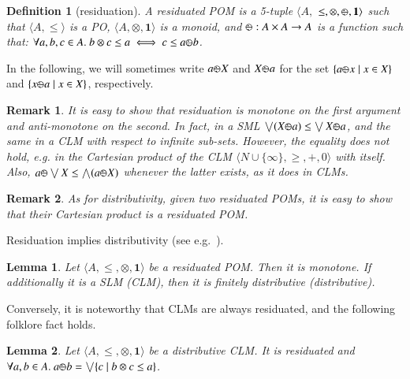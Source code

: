 \documentclass[a4paper]{elsarticle}
\newtheorem{definition}{Definition}
\newtheorem{remark}{Remark}
\newtheorem{lemma}{Lemma}
\newcommand{\monop}{\otimes}
\newcommand{\1}{\mathbf{1}}
\def\odiv{{ \ominus\hspace{-8pt}:}\;}
\begin{document}
\begin{definition}[residuation]
	A residuated POM is a 5-tuple $\langle A,$ $\leq, \otimes,  \odiv, \1 \rangle$ such that
	$\langle A, \leq \rangle$ is a PO,  $\langle A, \otimes, \1 \rangle$ is a monoid, and
	$\odiv: A \times A \rightarrow A$ is a function such that: $\forall a, b, c \in A.\ b \otimes c \leq a \iff c \leq a \odiv b$.
\end{definition}

In the following, we will sometimes write $a \odiv X$ and $X \odiv a$
for the set  $\{a \odiv x \mid x \in X\}$ and  $\{x \odiv a \mid x \in X\}$,
respectively.

\begin{remark}
	It is easy to show that residuation is monotone on the first argument and
	anti-monotone on the second. In fact, in a SML 
	$\bigvee (X \odiv a) \leq \bigvee X \odiv a$,
	and the same in a CLM with respect to infinite sub-sets.
	However, the equality does not hold,
	e.g. in the Cartesian product of the CLM  
	$\langle N \cup \{\infty\}, \geq, +, 0 \rangle$ with itself.
	Also, 
	$a \odiv \bigvee X \leq \bigwedge (a \odiv X)$
	whenever the latter exists, as it does in CLMs.
\end{remark}

\begin{remark}
	\label{remarkC}
	As for distributivity, given two residuated POMs, it is easy to show that their Cartesian product
	is a residuated POM.
\end{remark}

Residuation implies distributivity (see e.g.~\cite[Lemma 2.2]{ipl}).

\begin{lemma}
	Let $\langle A, \leq, \monop, \1 \rangle$ be a residuated POM. 
	Then it is monotone.
	If additionally it is a SLM (CLM), then it is finitely distributive
	(distributive).
\end{lemma}

Conversely, it is noteworthy that CLMs are always residuated,
and the following folklore fact holds.
%

\begin{lemma}
	\label{resCLM}
	Let $\langle A, \leq, \monop, \1 \rangle$ be a distributive CLM. 
	It is residuated and 
	$\forall a, b \in A.\ a \odiv b = \bigvee \{c \mid b \otimes c \leq a\}$.
\end{lemma}
\end{document}
